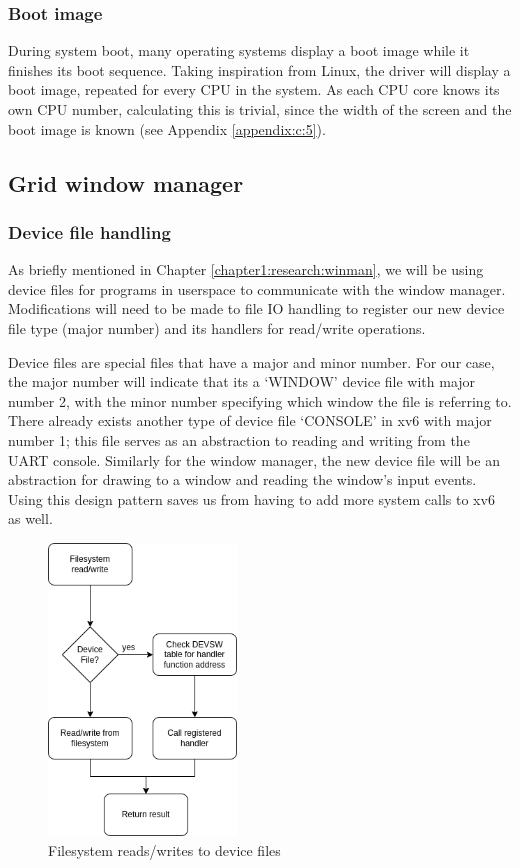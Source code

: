 \subsubsection{Boot image}
During system boot, many operating systems display a boot image while it finishes its
boot sequence. Taking inspiration from Linux, the driver will display a boot image, repeated
for every CPU in the system. As each CPU core knows its own CPU number, 
calculating this is trivial, since the width of the screen
and the boot image is known (see Appendix \ref{appendix:c:5}).

\subsection{Grid window manager}
\label{chapter2:impl:winman}

\subsubsection{Device file handling}
As briefly mentioned in Chapter \ref{chapter1:research:winman}, we will be using device files
for programs in userspace to communicate with the window manager. Modifications will need to be
made to file IO handling to register our new device file type (major number) and its handlers
for read/write operations.

Device files are special files that have a major and minor number. For our case,
the major number will indicate that its a `WINDOW' device file with major number 2, with 
the minor number specifying which window the file is referring to. There already
exists another type of device file `CONSOLE' in xv6 with major number 1; this file serves as an
abstraction to reading and writing from the UART console. Similarly for the
window manager, the new device file will be an abstraction for drawing to a window
and reading the window's input events. Using this design pattern saves us from having
to add more system calls to xv6 as well.

\begin{figure}
    \centering
    \includegraphics[width=5cm]{fio.drawio.png}
    \caption{Filesystem reads/writes to device files}
\end{figure}


